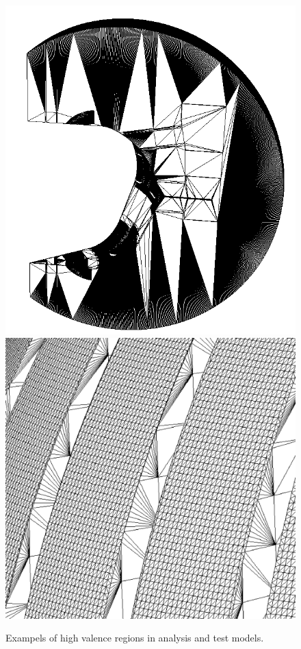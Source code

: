 \documentclass[10pt, a4paper]{article}
\begin{document}
\begin{figure}[H]
  \centering
    \includegraphics[scale=0.2]{iter_sideon.png}
    \includegraphics[scale=0.1]{ds_hv.png}
    \caption{Exampels of high valence regions in analysis and test models.}
\end{figure}
\end{document}
